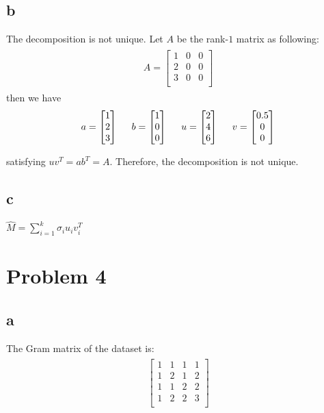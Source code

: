 \documentclass[a4paper,11pt]{article}
\theoremstyle{mytheor}
\begin{document}
\subsection*{b}
The decomposition is not unique.
Let $A$ be the rank-$1$ matrix as following:
\begin{align}
\begin{split}
A = \begin{bmatrix}
1  &0  &0 \\
2  &0  &0 \\
3  &0  &0 \\
\end{bmatrix}
\end{split}
\end{align}
then we have 
\begin{align}
\begin{split}
a = \begin{bmatrix}
1  \\
2  \\
3  \\
\end{bmatrix}
\hspace{0.5cm}
b = \begin{bmatrix}
1  \\
0  \\
0  \\
\end{bmatrix}
\hspace{0.5cm}
u = \begin{bmatrix}
2  \\
4  \\
6  \\
\end{bmatrix}
\hspace{0.5cm}
v = \begin{bmatrix}
0.5  \\
0  \\
0  \\
\end{bmatrix}
\end{split}
\end{align}

satisfying $uv^T = ab^T = A$. Therefore, the decomposition is not unique.

\subsection*{c}
$\widehat{M} = \sum\limits_{i=1}^{k}\sigma_i u_i v_i^T$


\section*{Problem 4}
\subsection*{a}
The Gram matrix of the dataset is:
\begin{align}
    \begin{split}
        \begin{bmatrix}
        1   &  1 &    1   &  1 \\
        1   &  2   &  1    & 2 \\
        1    & 1    & 2    & 2 \\
        1   &  2   &  2   &  3 \\
        \end{bmatrix}
    \end{split}
\end{align}
\end{document}
